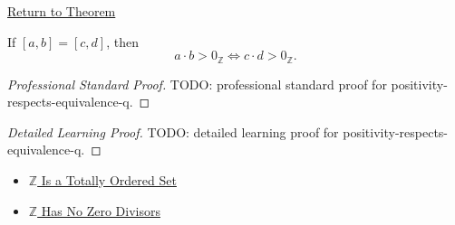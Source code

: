 \newpage
{}
\label{prf:positivity-respects-equivalence-q}

\begin{remark*}[Return]
\hyperref[lem:positivity-respects-equivalence-q]{Return to Theorem}
\end{remark*}

\begin{lemma*}
If $[a,b]=[c,d]$, then
\[
a\cdot b>0_{\mathbb{Z}}
\Longleftrightarrow
c\cdot d>0_{\mathbb{Z}}.
\]
\end{lemma*}

\begin{proof}[Professional Standard Proof]
\LRAProofBodyStart
TODO: professional standard proof for positivity-respects-equivalence-q.
\end{proof}

\begin{proof}[Detailed Learning Proof]
\LRAProofBodyStart
TODO: detailed learning proof for positivity-respects-equivalence-q.
\end{proof}

\begin{remark*}
\end{remark*}

\begin{dependencies}
\begin{itemize}
  \item \hyperref[thm:z-totally-ordered-set]{$\mathbb{Z}$ Is a Totally Ordered Set}
  \item \hyperref[thm:z-has-no-zero-divisors]{$\mathbb{Z}$ Has No Zero Divisors}
\end{itemize}
\end{dependencies}

\clearpage
